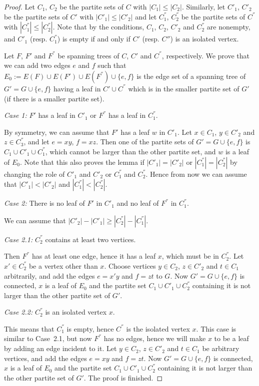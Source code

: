 \documentclass[12pt,a4paper]{amsart}
\theoremstyle{plain}
\theoremstyle{definition}
\begin{document}
\begin{proof}
    Let $C_1$, $C_2$ be the partite sets of $C$ with $|C_1| \leq |C_2|$. Similarly, let $C'_1$, $C'_2$ be the partite sets of $C'$ with $|C'_1| \leq |C'_2|$ and let $C^{''}_1$, $C^{''}_2$ be the partite sets of $C^{''}$ with $|C^{''}_1| \leq |C^{''}_2|$. Note that by the conditions, $C_1$, $C_2$, $C'_2$ and $C^{''}_2$ are nonempty, and $C'_1$ (resp. $C^{''}_1$) is empty if and only if $C'$ (resp. $C''$) is an isolated vertex.
    
    Let $F$, $F'$ and $F^{''}$ be spanning trees of $C$, $C'$ and $C^{''}$, respectively. We prove that we can add two edges $e$ and $f$ such that $E_0:=E(F) \cup E(F') \cup E(F^{''}) \cup \{e,f\}$ is the edge set of a spanning tree of $G'=G \cup \{e,f\}$ having a leaf in $C' \cup C^{''}$ which is in the smaller partite set of $G'$ (if there is a smaller partite set).

    \textit{Case 1:} $F'$ has a leaf in $C'_1$ or $F^{''}$ has a leaf in $C^{''}_1$.

    By symmetry, we can assume that $F'$ has a leaf $w$ in $C'_1$. Let $x \in C_1$, $y \in C'_2$ and $z \in C^{''}_3$, and let $e=xy$, $f=xz$. Then one of the partite sets of $G'=G \cup \{e,f\}$ is $C_1 \cup C'_1 \cup C^{''}_1$, which cannot be larger than the other partite set, and $w$ is a leaf of $E_0$. Note that this also proves the lemma if $|C'_1|=|C'_2|$ or $|C^{''}_1|=|C^{''}_2|$ by changing the role of $C'_1$ and $C'_2$ or $C^{''}_1$ and $C^{''}_2$. Hence from now we can assume that $|C'_1| < |C'_2|$ and $|C^{''}_1| <|C^{''}_2|$.

    \textit{Case 2:} There is no leaf of $F'$ in $C'_1$ and no leaf of $F^{''}$ in $C^{''}_1$.

    We can assume that $|C'_2|-|C'_1| \geq |C^{''}_2|-|C^{''}_1|$. 

    \textit{Case 2.1:} $C^{''}_2$ contains at least two vertices.

    Then $F^{''}$ has at least one edge, hence it has a leaf $x$, which must be in $C^{''}_2$. Let $x' \in C^{''}_2$ be a vertex other than $x$. Choose vertices $y \in C_2$, $z \in C'_2$ and $t \in C_1$ arbitrarily, and add the edges $e=x'y$ and $f=zt$ to $G$. Now $G'=G \cup \{e,f\}$ is connected, $x$ is a leaf of $E_0$ and the partite set $C_1 \cup C'_1 \cup C^{''}_2$ containing it is not larger than the other partite set of $G'$.
    
    \textit{Case 2.2:} $C^{''}_2$ is an isolated vertex $x$.

    This means that $C^{''}_1$ is empty, hence $C^{''}$ is the isolated vertex $x$. This case is similar to Case~2.1, but now $F^{''}$ has no edges, hence we will make $x$ to be a leaf by adding an edge incident to it.
    Let $y \in C_2$, $z \in C'_2$ and $t \in C_1$ be arbitrary vertices, and add the edges $e=xy$ and $f=zt$. Now $G'=G \cup \{e,f\}$ is connected, $x$ is a leaf of $E_0$ and the partite set $C_1 \cup C'_1 \cup C^{''}_2$ containing it is not larger than the other partite set of $G'$. The proof is finished.
\end{proof}
\end{document}
